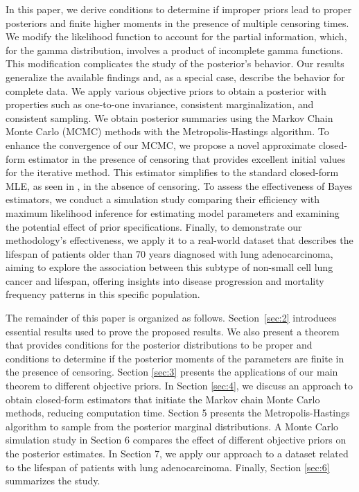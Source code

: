 \documentclass[12pt]{article} %
\theoremstyle{plain}%
\theoremstyle{definition}
\theoremstyle{remark}
\begin{document}
In this paper, we derive conditions to determine if improper priors lead to proper posteriors and finite higher moments in the presence of multiple censoring times. We modify the likelihood function to account for the partial information, which, for the gamma distribution, involves a product of incomplete gamma functions. This modification complicates the study of the posterior's behavior. Our results generalize the available findings and, as a special case, describe the behavior for complete data. We apply various objective priors to obtain a posterior with properties such as one-to-one invariance, consistent marginalization, and consistent sampling. We obtain posterior summaries using the Markov Chain Monte Carlo (MCMC) methods with the Metropolis-Hastings algorithm. To enhance the convergence of our MCMC, we propose a novel approximate closed-form estimator in the presence of censoring that provides excellent initial values for the iterative method. This estimator simplifies to the standard closed-form MLE, as seen in  \cite{ye2017closed}, in the absence of censoring. To assess the effectiveness of Bayes estimators, we conduct a simulation study comparing their efficiency with maximum likelihood inference for estimating model parameters and examining the potential effect of prior specifications. Finally, to demonstrate our methodology's effectiveness, we apply it to a real-world dataset that describes the lifespan of patients older than 70 years diagnosed with lung adenocarcinoma, aiming to explore the association between this subtype of non-small cell lung cancer and lifespan, offering insights into disease progression and mortality frequency patterns in this specific population.

The remainder of this paper is organized as follows. Section~\ref{sec:2} introduces essential results used to prove the proposed results. We also present a theorem that provides conditions for the posterior distributions to be proper and conditions to determine if the posterior moments of the parameters are finite in the presence of censoring. Section \ref{sec:3} presents the applications of our main theorem to different objective priors. In Section \ref{sec:4}, we discuss an approach to obtain closed-form estimators that initiate the Markov chain Monte Carlo methods, reducing computation time. Section 5 presents the Metropolis-Hastings algorithm to sample from the posterior marginal distributions. A Monte Carlo simulation study in Section 6 compares the effect of different objective priors on the posterior estimates. In Section 7, we apply our approach to a dataset related to the lifespan of patients with lung adenocarcinoma. Finally, Section \ref{sec:6} summarizes the study.
\end{document}
